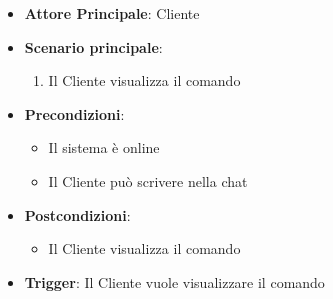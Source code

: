 \label{uc_43.1.6}
\begin{itemize}
    \item \textbf{Attore Principale}: Cliente
	\item \textbf{Scenario principale}:
	\begin{enumerate}
		\item Il Cliente visualizza il comando 
	\end{enumerate}
	\item \textbf{Precondizioni}:
	\begin{itemize}
		\item Il sistema è online 
		\item Il Cliente può scrivere nella chat
	\end{itemize}
	\item \textbf{Postcondizioni}:
	\begin{itemize}
		\item Il Cliente visualizza il comando 
	\end{itemize}
	\item \textbf{Trigger}: Il Cliente vuole visualizzare il comando 
\end{itemize}